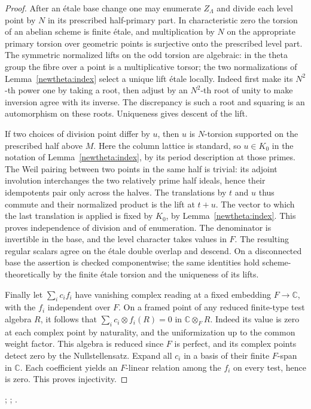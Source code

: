 \begin{proof}
After an étale base change one may enumerate \(Z_\Lambda\) and
divide each level point by \(N\) in its prescribed half-primary
part. In characteristic zero the torsion of an abelian scheme
is finite étale, and multiplication by \(N\) on the appropriate
primary torsion over geometric points is surjective onto the
prescribed level part. The symmetric normalized lifts on the
odd torsion are algebraic: in the theta group the fibre over
a point is a multiplicative torsor; the two normalizations of
Lemma~\ref{newtheta:index} select a unique lift étale locally.
Indeed first make its \(N^2\)-th power one by taking a root,
then adjust by an \(N^2\)-th root of unity to make inversion
agree with its inverse. The discrepancy is such a root and
squaring is an automorphism on these roots. Uniqueness gives
descent of the lift.

If two choices of division point differ by \(u\), then \(u\)
is \(N\)-torsion supported on the prescribed half above \(M\).
Here the column lattice is standard, so \(u\in K_0\) in the
notation of Lemma~\ref{newtheta:index}, by its period description
at those primes. The Weil pairing between two points in the
same half is trivial: its adjoint involution interchanges the
two relatively prime half ideals, hence their idempotents pair
only across the halves. The translations by \(t\) and \(u\) thus
commute and their normalized product is the lift at \(t+u\).
The vector to which the last translation is applied is fixed by
\(K_0\), by Lemma~\ref{newtheta:index}. This proves independence
of division and of enumeration. The denominator is invertible
in the base, and the level character takes values in \(F\).
The resulting regular scalars agree on the étale double overlap
and descend. On a disconnected base the assertion is checked
componentwise; the same identities hold scheme-theoretically by
the finite étale torsion and the uniqueness of its lifts.

Finally let \(\sum_i c_i f_i\) have vanishing complex reading
at a fixed embedding \(F\to\mathbb C\), with the \(f_i\)
independent over \(F\). On a framed point of any reduced
finite-type test algebra \(R\), it follows that
\(\sum_i c_i\otimes f_i(R)=0\) in \(\mathbb C\otimes_F R\).
Indeed its value is zero at each complex point by naturality,
and the uniformization up to the common weight factor.
This algebra is reduced since
\(F\) is perfect, and its complex points detect zero by the
Nullstellensatz. Expand all \(c_i\) in a basis of their finite
\(F\)-span in \(\mathbb C\). Each coefficient yields an \(F\)-linear
relation among the \(f_i\) on every test, hence is zero. This
proves injectivity.
\end{proof}
;
;
.

